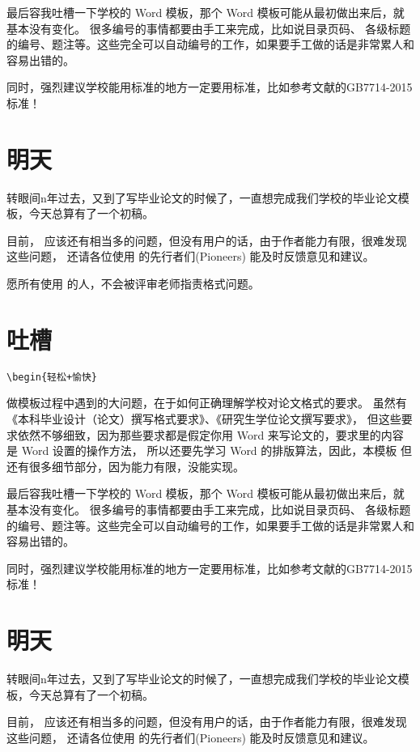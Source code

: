 最后容我吐槽一下学校的 Word 模板，那个 Word 模板可能从最初做出来后，就基本没有变化。
很多编号的事情都要由手工来完成，比如说目录页码、
各级标题的编号、题注等。这些完全可以自动编号的工作，如果要手工做的话是非常累人和容易出错的。

同时，强烈建议学校能用标准的地方一定要用标准，比如参考文献的GB7714-2015标准！

\section{明天}

转眼间n年过去，又到了写毕业论文的时候了，一直想完成我们学校的毕业论文模板，今天总算有了一个初稿。

目前， \nwafuthesis{} 应该还有相当多的问题，但没有用户的话，由于作者能力有限，很难发现这些问题，
还请各位使用 \nwafuthesis{} 的先行者们(Pioneers) 能及时反馈意见和建议。

愿所有使用 \nwafuthesis{} 的人，不会被评审老师指责格式问题。

\section{吐槽}

\verb!\begin{轻松+愉快}!

做模板过程中遇到的大问题，在于如何正确理解学校对论文格式的要求。
虽然有《本科毕业设计（论文）撰写格式要求》、《研究生学位论文撰写要求》，
但这些要求依然不够细致，因为那些要求都是假定你用 Word 来写论文的，要求里的内容是 Word 设置的操作方法，
所以还要先学习 Word 的排版算法，因此，本模板
但还有很多细节部分，因为能力有限，没能实现。

最后容我吐槽一下学校的 Word 模板，那个 Word 模板可能从最初做出来后，就基本没有变化。
很多编号的事情都要由手工来完成，比如说目录页码、
各级标题的编号、题注等。这些完全可以自动编号的工作，如果要手工做的话是非常累人和容易出错的。

同时，强烈建议学校能用标准的地方一定要用标准，比如参考文献的GB7714-2015标准！

\section{明天}

转眼间n年过去，又到了写毕业论文的时候了，一直想完成我们学校的毕业论文模板，今天总算有了一个初稿。

目前， \nwafuthesis{} 应该还有相当多的问题，但没有用户的话，由于作者能力有限，很难发现这些问题，
还请各位使用 \nwafuthesis{} 的先行者们(Pioneers) 能及时反馈意见和建议。

